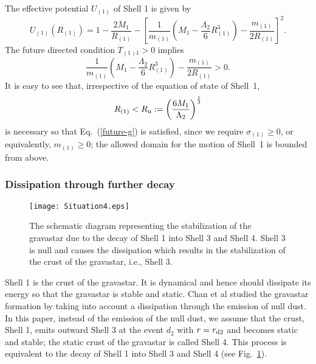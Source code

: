 \documentclass[aps,preprint,preprintnumber,nofootinbib,amsmath,amssymb,ascmac,bm,12pt]{revtex4}
\newcommand{\rdt}{r_{\rm d2}}
\newcommand{\Ru}{R_{\rm u}}
\newcommand{\mo}{m_{(1)}}
\newcommand{\Ron}{R_{(1)}}
\newcommand{\Uon}{U_{(1)}}
\begin{document}
The effective potential $\Uon$ of Shell 1 is given by
$$
\Uon\left(\Ron\right)=1-\frac{2M_1}{\Ron}
-\left[\frac{1}{\mo}\left(M_1-\frac{\Lambda_2}{6}\Ron^3\right)-\frac{\mo}{2\Ron}\right]^2.
$$
The future directed condition $\dot{T}_{(1)1}>0$ implies
\begin{equation}
\frac{1}{\mo}\left(M_1-\frac{\Lambda_2}{6}\Ron^3\right)-\frac{\mo}{2\Ron}>0. \label{future-g}
\end{equation}
It is easy to see that,  irrespective of the equation of state of Shell~1,  
\begin{equation}
\Ron<\Ru:=\left(\frac{6M_1}{\Lambda_2}\right)^{1\over3}  \label{Ru}
\end{equation}
is necessary so that Eq.~(\ref{future-g}) is satisfied, since we require 
$\sigma_{(1)}\geq0$, or equivalently, $\mo\geq0$; 
the allowed domain for the motion of Shell~1 is bounded from above. 


\subsubsection{Dissipation through further decay}

\begin{figure}[htbp]
 \begin{center}
 \texttt{[image: Situation4.eps]}
 \end{center}
 \caption{
The schematic diagram representing the stabilization of the gravastar 
due to the decay of Shell 1 into Shell 3 and Shell 4. Shell 3 is null and causes the 
dissipation which results in the stabilization of the crust of the gravastar, i.e., Shell 3.  }
 \label{Emission}
\end{figure}


Shell 1 is the crust of the gravastar. It is dynamical and hence  
should dissipate its energy so that the gravastar is stable and static. 
Chan et al studied the gravastar formation by taking into account a dissipation through the 
emission of null dust\cite{CSRW}. 
In this paper, instead of the emission of the null dust, we 
assume that the crust, Shell 1, emits outward Shell 3 at the event $d_2$ with $r=\rdt$ and becomes static and stable; 
the static crust of the gravastar is called Shell 4.  
This process is equivalent to the decay of Shell 1 into Shell 3 and Shell 4  (see Fig.~\ref{Emission}). 
\end{document}
